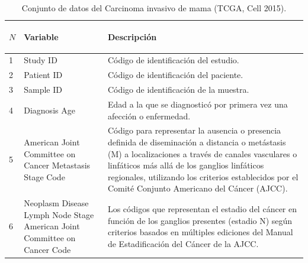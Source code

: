 \begin{table} [!htb]
	\footnotesize
	\begin{threeparttable}
		\caption{Conjunto de datos del Carcinoma invasivo de mama (TCGA, Cell 2015).}
		\label{brca_tcga_pub2015_clinical_data}
		\begin{tabular}{p{1cm} p{4cm} p{10cm}} \toprule	
			\begin{center}$N$\end{center}   
			&\begin{center}Variable\end{center}             
			&\begin{center}Descripción\end{center}      
			\\ \hline	
			1
			&Study ID
			&Código de identificación del estudio.
			\\ \hline
			2
			&Patient ID
			&Código de identificación del paciente.
			\\ \hline
			3
			&Sample ID
			&Código de identificación de la muestra.
			\\ \hline
			4
			&Diagnosis Age
			&Edad a la que se diagnosticó por primera vez una afección o enfermedad.
			\\ \hline
			5
			&American Joint Committee on Cancer Metastasis Stage Code
			&Código para representar la ausencia o presencia definida de diseminación a distancia o metástasis (M) a localizaciones a través de canales vasculares o linfáticos más allá de los ganglios linfáticos regionales, utilizando los criterios establecidos por el Comité Conjunto Americano del Cáncer (AJCC).
			\\ \hline
			6
			&Neoplasm Disease Lymph Node Stage American Joint Committee on Cancer Code
			&Los códigos que representan el estadio del cáncer en función de los ganglios presentes (estadio N) según criterios basados en múltiples ediciones del Manual de Estadificación del Cáncer de la AJCC.
			\\ \hline

\end{tabular}
\end{threeparttable}
\end{table}
